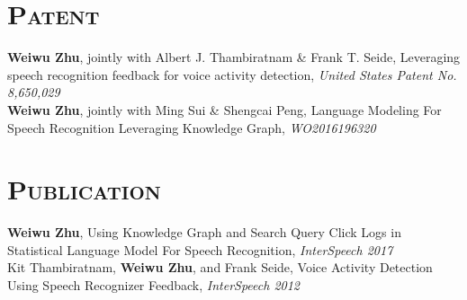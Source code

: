 \begin{resume}



\vspace*{-4pt}
\section{\textsc{Patent}}
\textbf{Weiwu Zhu}, jointly with Albert J. Thambiratnam \& Frank T. Seide, Leveraging speech recognition feedback for voice activity detection, {\it United States Patent No. 8,650,029}\\
\vspace*{-6pt}
\newline
\textbf{Weiwu Zhu}, jointly with Ming Sui \& Shengcai Peng, Language Modeling For Speech Recognition Leveraging Knowledge Graph, {\it WO2016196320}\\

\vspace*{-14pt}
\section{\textsc{Publication}}
\textbf{Weiwu Zhu}, Using Knowledge Graph and Search Query Click Logs in Statistical Language Model For Speech Recognition, {\it InterSpeech 2017}\\
\vspace*{-6pt}
\newline
Kit Thambiratnam, \textbf{Weiwu Zhu}, and Frank Seide, Voice Activity Detection Using Speech Recognizer Feedback, {\it InterSpeech 2012}\\





\end{resume}
